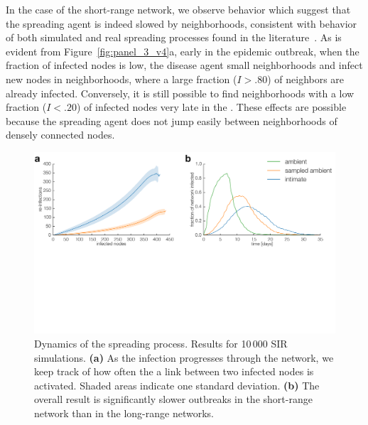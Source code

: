 \documentclass[fleqn,10pt]{wlscirep}
\begin{document}
In the case of the short-range network, we observe behavior which suggest that the spreading agent is indeed slowed by neighborhoods, consistent with behavior of both simulated and real spreading processes found in the literature~\cite{fowler2008dynamic, mucha2010community, salathe2010dynamics, karsai2011small, cauchemez2011role}. 
As is evident from Figure~\ref{fig:panel_3_v4}a, early in the epidemic outbreak, when the fraction of infected nodes is low, the disease agent  small neighborhoods and infect new nodes in neighborhoods, where a large fraction ($I>.80$) of neighbors are already infected.
Conversely, it is still possible to find neighborhoods with a low fraction ($I<.20$) of infected nodes very late in the .
These effects are possible because the spreading agent does not jump easily between neighborhoods of densely connected nodes.

\begin{figure}
\begin{center}
\includegraphics[width=\hsize]{panel_4}
\end{center}
\caption{Dynamics of the spreading process.
Results for 10\,000 SIR simulations. 
\textbf{(a)} As the infection progresses through the network, we keep track of how often the a link between two infected nodes is activated. Shaded areas indicate one standard deviation.
\textbf{(b)} The overall result is significantly slower outbreaks in the short-range network than in the long-range networks.
\label{fig:panel_3_v2_2}}
\end{figure}
\end{document}
